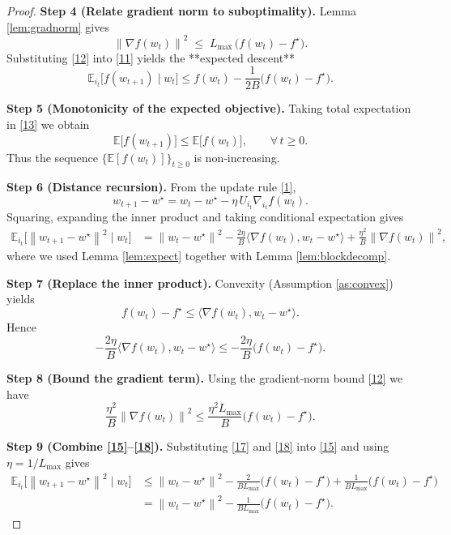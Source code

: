 \documentclass{article}
\newcommand{\E}{\mathbb{E}}
\newcommand{\norm}[1]{\left\lVert #1\right\rVert}
\newcommand{\ip}[2]{\langle #1 , #2\rangle}
\newcommand{\block}[1]{U_{#1}}
\begin{document}
\begin{proof}
\noindent\textbf{Step 4 (Relate gradient norm to suboptimality).}  
Lemma \ref{lem:gradnorm} gives
\[
\norm{\nabla f(w_{t})}^{2}\;\le\;L_{\max}\,\bigl(f(w_{t})-f^{\star}\bigr).
\tag{12}
\]
Substituting \eqref{12} into \eqref{11} yields the **expected descent**
\[
\E_{i_{t}}\!\bigl[f(w_{t+1})\mid w_{t}\bigr]
\le f(w_{t})-\frac{1}{2B}\bigl(f(w_{t})-f^{\star}\bigr).
\tag{13}
\]

\noindent\textbf{Step 5 (Monotonicity of the expected objective).}  
Taking total expectation in \eqref{13} we obtain
\[
\E\!\bigl[f(w_{t+1})\bigr]\le \E\!\bigl[f(w_{t})\bigr],
\qquad\forall\,t\ge0.
\tag{14}
\]
Thus the sequence $\bigl\{\E[f(w_{t})]\bigr\}_{t\ge0}$ is non‑increasing.

\noindent\textbf{Step 6 (Distance recursion).}  
From the update rule \eqref{1},
\[
w_{t+1}-w^{\star}=w_{t}-w^{\star}
               -\eta\,\block{i_{t}}\nabla_{i_{t}}f(w_{t}).
\]
Squaring, expanding the inner product and taking conditional expectation gives
\begin{align}
\E_{i_{t}}\!\bigl[\norm{w_{t+1}-w^{\star}}^{2}\mid w_{t}\bigr]
&= \norm{w_{t}-w^{\star}}^{2}
   -\frac{2\eta}{B}\ip{\nabla f(w_{t})}{w_{t}-w^{\star}}
   +\frac{\eta^{2}}{B}\norm{\nabla f(w_{t})}^{2},
\tag{15}
\end{align}
where we used Lemma \ref{lem:expect} together with Lemma \ref{lem:blockdecomp}.

\noindent\textbf{Step 7 (Replace the inner product).}  
Convexity (Assumption \ref{as:convex}) yields
\[
f(w_{t})-f^{\star}\le \ip{\nabla f(w_{t})}{w_{t}-w^{\star}} .
\tag{16}
\]
Hence
\[
-\frac{2\eta}{B}\ip{\nabla f(w_{t})}{w_{t}-w^{\star}}
\le -\frac{2\eta}{B}\bigl(f(w_{t})-f^{\star}\bigr).
\tag{17}
\]

\noindent\textbf{Step 8 (Bound the gradient term).}  
Using the gradient‑norm bound \eqref{12} we have
\[
\frac{\eta^{2}}{B}\norm{\nabla f(w_{t})}^{2}
\le \frac{\eta^{2}L_{\max}}{B}\bigl(f(w_{t})-f^{\star}\bigr).
\tag{18}
\]

\noindent\textbf{Step 9 (Combine \eqref{15}–\eqref{18}).}  
Substituting \eqref{17} and \eqref{18} into \eqref{15} and using $\eta=1/L_{\max}$ gives
\begin{align}
\E_{i_{t}}\!\bigl[\norm{w_{t+1}-w^{\star}}^{2}\mid w_{t}\bigr]
&\le \norm{w_{t}-w^{\star}}^{2}
   -\frac{2}{B L_{\max}}\bigl(f(w_{t})-f^{\star}\bigr)
   +\frac{1}{B L_{\max}}\bigl(f(w_{t})-f^{\star}\bigr) \nonumber\\
&= \norm{w_{t}-w^{\star}}^{2}
   -\frac{1}{B L_{\max}}\bigl(f(w_{t})-f^{\star}\bigr).
\tag{19}
\end{align}


\end{proof}
\end{document}
